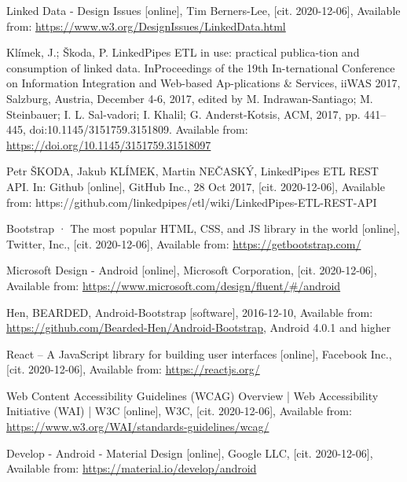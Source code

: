 
\begin{thebibliography}{99}

 Linked Data - Design Issues [online], Tim Berners-Lee, [cit. 2020-12-06], Available from: \url{https://www.w3.org/DesignIssues/LinkedData.html}

 Klímek, J.; Škoda, P. LinkedPipes ETL in use: practical publica-tion and consumption of linked data. InProceedings of the 19th In-ternational Conference on Information Integration and Web-based Ap-plications \& Services, iiWAS 2017, Salzburg, Austria, December 4-6, 2017, edited by M. Indrawan-Santiago; M. Steinbauer; I. L. Sal-vadori; I. Khalil; G. Anderst-Kotsis, ACM, 2017, pp. 441–445, doi:10.1145/3151759.3151809. Available from: \url{https://doi.org/10.1145/3151759.31518097}

 Petr ŠKODA, Jakub KLÍMEK, Martin NEČASKÝ, LinkedPipes ETL REST API. In: Github [online], GitHub Inc., 28 Oct 2017, [cit. 2020-12-06], Available from: https://github.com/linkedpipes/etl/wiki/LinkedPipes-ETL-REST-API

 Bootstrap · The most popular HTML, CSS, and JS library in the world [online], Twitter, Inc., [cit. 2020-12-06], Available from: \url{https://getbootstrap.com/}

 Microsoft Design - Android [online], Microsoft Corporation, [cit. 2020-12-06], Available from: \url{https://www.microsoft.com/design/fluent/#/android}

 Hen, \MakeUppercase{Bearded}, Android-Bootstrap [software], 2016-12-10, Available from: \url{https://github.com/Bearded-Hen/Android-Bootstrap}, Android 4.0.1 and higher

 React – A JavaScript library for building user interfaces [online], Facebook Inc., [cit. 2020-12-06], Available from: \url{https://reactjs.org/}

 Web Content Accessibility Guidelines (WCAG) Overview | Web Accessibility Initiative (WAI) | W3C [online], W3C, [cit. 2020-12-06], Available from: \url{https://www.w3.org/WAI/standards-guidelines/wcag/}

 Develop - Android - Material Design [online], Google LLC, [cit. 2020-12-06], Available from: \url{https://material.io/develop/android}


\end{thebibliography}
